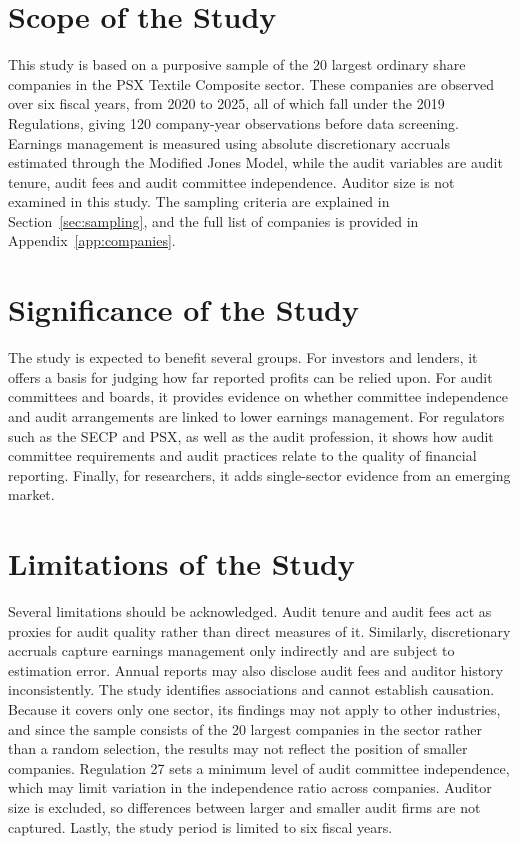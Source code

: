 \section{Scope of the Study}

This study is based on a purposive sample of the 20 largest ordinary share companies in the PSX Textile Composite sector. These companies are observed over six fiscal years, from 2020 to 2025, all of which fall under the 2019 Regulations, giving 120 company-year observations before data screening. Earnings management is measured using absolute discretionary accruals estimated through the Modified Jones Model, while the audit variables are audit tenure, audit fees and audit committee independence. Auditor size is not examined in this study. The sampling criteria are explained in Section~\ref{sec:sampling}, and the full list of companies is provided in Appendix~\ref{app:companies}.

\section{Significance of the Study}

The study is expected to benefit several groups. For investors and lenders, it offers a basis for judging how far reported profits can be relied upon. For audit committees and boards, it provides evidence on whether committee independence and audit arrangements are linked to lower earnings management. For regulators such as the SECP and PSX, as well as the audit profession, it shows how audit committee requirements and audit practices relate to the quality of financial reporting. Finally, for researchers, it adds single-sector evidence from an emerging market.

\section{Limitations of the Study}
\label{sec:limitations}

Several limitations should be acknowledged. Audit tenure and audit fees act as proxies for audit quality rather than direct measures of it. Similarly, discretionary accruals capture earnings management only indirectly and are subject to estimation error. Annual reports may also disclose audit fees and auditor history inconsistently. The study identifies associations and cannot establish causation. Because it covers only one sector, its findings may not apply to other industries, and since the sample consists of the 20 largest companies in the sector rather than a random selection, the results may not reflect the position of smaller companies. Regulation 27 sets a minimum level of audit committee independence, which may limit variation in the independence ratio across companies. Auditor size is excluded, so differences between larger and smaller audit firms are not captured. Lastly, the study period is limited to six fiscal years.

